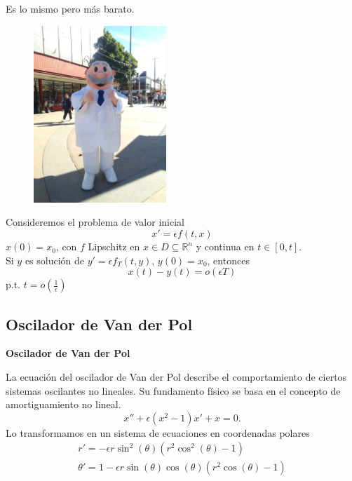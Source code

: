 \documentclass[10pt]{beamer}
\newtheorem{final remarks}{final remarks}[section]
\newtheorem{future work collaboration}{future work collaboration}[section]
\begin{document}
\begin{frame}
    Es lo mismo pero m\'as barato.
    \begin{figure}[h]
		\centering
		\includegraphics[width=5cm]{Img/simi.jpg}
	\end{figure}
\end{frame}

\begin{frame}
    
    \begin{lemma}
        Consideremos el problema de valor inicial
        $$
            x'=\epsilon f(t,x)
        $$
        $x(0)=x_0$, con $f$ Lipschitz en $x\in D\subseteq\mathbb{R}^n$ y continua
        en $t\in[0,t]$. \\
        Si $y$ es soluci\'on de $y'=\epsilon f_T(t,y)$, $y(0)=x_0$, entonces
        $$
            x(t)-y(t)=o(\epsilon T)
        $$
        p.t. $t=o(\frac{1}{\epsilon})$
    \end{lemma}

    

\end{frame}


\subsection{Oscilador de Van der Pol}
\begin{frame}
\begin{center}
    \textbf{Oscilador de Van der Pol}
\end{center}
La ecuaci\'on del oscilador de Van der Pol describe el comportamiento 
de ciertos sistemas oscilantes no lineales.
Su fundamento f\'isico se basa en el concepto de amortiguamiento no lineal.
$$x''+\epsilon(x^2-1)x'+x=0.$$
Lo transformamos en un sistema de ecuaciones en coordenadas polares
$$
\begin{matrix}
    r'=-\epsilon r \sin^2(\theta)(r^2\cos^2(\theta)-1) \\ 
    \theta' = 1-\epsilon r \sin(\theta)\cos(\theta)(r^2\cos(\theta)-1)
\end{matrix}$$
\end{frame}
\end{document}
